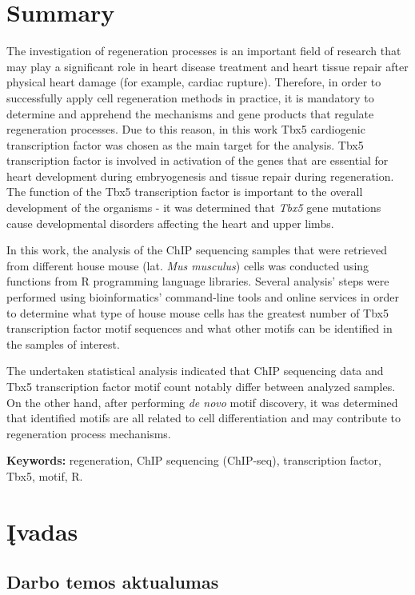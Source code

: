\documentclass[12pt]{article}
\begin{document}
\section*{Summary}
The investigation of regeneration processes is an important field of research
that may play a significant role in heart disease treatment and heart tissue
repair after physical heart damage (for example, cardiac rupture). Therefore,
in order to successfully apply cell regeneration methods in practice, it is
mandatory to determine and apprehend the mechanisms and gene products that
regulate regeneration processes. Due to this reason, in this work Tbx5
cardiogenic transcription factor was chosen as the main target for the
analysis. Tbx5 transcription factor is involved in activation of the genes
that are essential for heart development during embryogenesis and tissue
repair during regeneration. The function of the Tbx5 transcription factor is
important to the overall development of the organisms -  it was determined
that \emph{Tbx5} gene mutations cause developmental disorders affecting the
heart and upper limbs.

In this work, the analysis of the ChIP sequencing samples that were retrieved
from different house mouse (lat. \emph{Mus musculus}) cells was conducted using
functions from R programming language libraries. Several analysis' steps were
performed using bioinformatics' command-line tools and online services in order
to determine what type of house mouse cells has the greatest number of Tbx5
transcription factor motif sequences and what other motifs can be identified in
the samples of interest.

The undertaken statistical analysis indicated that ChIP sequencing data and
Tbx5 transcription factor motif count notably differ between analyzed samples.
On the other hand, after performing \emph{de novo} motif discovery, it was
determined that identified motifs are all related to cell differentiation and
may contribute to regeneration process mechanisms.

\hfill \break
\textbf{Keywords:} regeneration, ChIP sequencing (ChIP-seq),
    transcription factor, Tbx5, motif, R.
\newpage


\section{Įvadas}
\subsection*{Darbo temos aktualumas}
\end{document}

